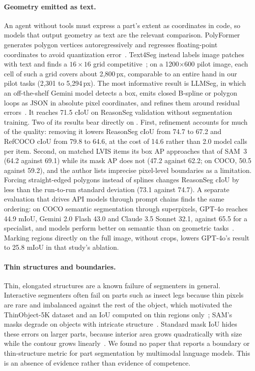 \paragraph{Geometry emitted as text.} An \anibench{} agent without tools must express a part's extent as coordinates in code, so models that output geometry as text are the relevant comparison. PolyFormer generates polygon vertices autoregressively and regresses floating-point coordinates to avoid quantization error~\citep{liu2023polyformer}. Text4Seg instead labels image patches with text and finds a $16\times16$ grid competitive~\citep{lan2025text4seg}; on a 1200$\times$600 pilot image, each cell of such a grid covers about 2{,}800\,px, comparable to an entire hand in our pilot tasks (2{,}301 to 5{,}294\,px). The most informative result is LLMSeg, in which an off-the-shelf Gemini model detects a box, emits closed B-spline or polygon loops as JSON in absolute pixel coordinates, and refines them around residual errors~\citep{hamdi2026llmseg}. It reaches 71.5 cIoU on ReasonSeg validation without segmentation training. Two of its results bear directly on \anibench{}. First, refinement accounts for much of the quality: removing it lowers ReasonSeg cIoU from 74.7 to 67.2 and RefCOCO cIoU from 79.8 to 64.6, at the cost of 14.6 rather than 2.0 model calls per item. Second, on matched LVIS items its box AP approaches that of SAM~3 (64.2 against 69.1) while its mask AP does not (47.2 against 62.2; on COCO, 50.5 against 59.2), and the author lists imprecise pixel-level boundaries as a limitation. Forcing straight-edged polygons instead of splines changes ReasonSeg cIoU by less than the run-to-run standard deviation (73.1 against 74.7). A separate evaluation that drives API models through prompt chains finds the same ordering: on COCO semantic segmentation through superpixels, GPT-4o reaches 44.9 mIoU, Gemini 2.0 Flash 43.0 and Claude 3.5 Sonnet 32.1, against 65.5 for a specialist, and models perform better on semantic than on geometric tasks~\citep{ramachandran2025gpt4ovision}. Marking regions directly on the full image, without crops, lowers GPT-4o's result to 25.8 mIoU in that study's ablation.

\paragraph{Thin structures and boundaries.} Thin, elongated structures are a known failure of segmenters in general. Interactive segmenters often fail on parts such as insect legs because thin pixels are rare and imbalanced against the rest of the object, which motivated the ThinObject-5K dataset and an IoU computed on thin regions only~\citep{liew2021thinobject}; SAM's masks degrade on objects with intricate structure~\citep{ke2023hqsam}. Standard mask IoU hides these errors on larger parts, because interior area grows quadratically with size while the contour grows linearly~\citep{cheng2021boundaryiou}. We found no paper that reports a boundary or thin-structure metric for part segmentation by multimodal language models. This is an absence of evidence rather than evidence of competence.

